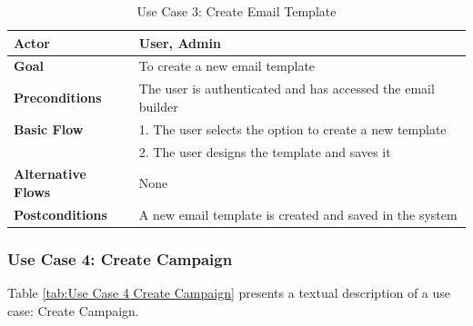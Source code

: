\begin{table}[ht]
	\centering
	\begin{tabularx}{\textwidth}{|l|X|}
		\hline
		\textbf{Actor}             & User, Admin                                                  \\
		\hline
		\textbf{Goal}              & To create a new email template                               \\
		\hline
		\textbf{Preconditions}     & The user is authenticated and has accessed the email builder \\
		\hline
		\textbf{Basic Flow}        & 1. The user selects the option to create a new template      \\
		                           & 2. The user designs the template and saves it                \\
		\hline
		\textbf{Alternative Flows} & None                                                         \\
		\hline
		\textbf{Postconditions}    & A new email template is created and saved in the system      \\
		\hline
	\end{tabularx}
	\caption{Use Case 3: Create Email Template}
	\label{tab:Use Case 3 Create Email Template}
\end{table}


\subsubsection{Use Case 4: Create Campaign}

Table \ref{tab:Use Case 4 Create Campaign} presents a textual description of a use case: Create Campaign.

